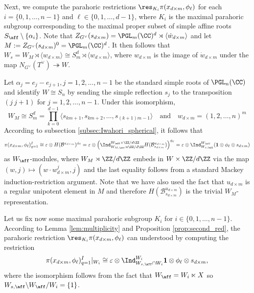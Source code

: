 Next, we compute the parahoric restrictions $\res_{K_i}\pi(x_{d\times m},\phi_\ell)$ for each $i=\{0,1,\ldots,n-1\}$ and $\ell\in\{0,1,\ldots,d-1\}$, where $K_i$ is the maximal parahoric subgroup corresponding to the maximal proper subset of simple affine roots $S_{\aff}\setminus\{\alpha_i\}$. Note that $Z_{G^\vee}(s_{d\times m})=\PGL_m(\CC)^d\rtimes\langle\dot{w}_{d\times m}\rangle$ and let $M:=Z_{G^\vee}(s_{d\times m})^0=\PGL_m(\CC)^d$. It then follows that $W_s=W_M\rtimes\langle w_{d\times m}\rangle\cong S_m^d\rtimes\langle w_{d\times m}\rangle$, where $w_{d\times m}$ is the image of $\dot{w}_{d\times m}$ under the map $N_{G^\vee}(T^\vee)\twoheadrightarrow W$. 

Let $\alpha_j=e_j-e_{j+1}, j=1,2,\ldots, n-1$ be the standard simple roots of $\PGL_n(\CC)$ and identify $W\cong S_n$ by sending the simple reflection $s_j$ to the transposition $(j\ j+1)$ for $j=1,2,\ldots,n-1$. Under this isomorphism, 
$$W_M\cong S_m^d=\prod_{k=0}^{d-1}\langle s_{km+1},s_{km+2},\ldots,s_{(k+1)m-1}\rangle\quad\text{and}\quad w_{d\times m}=(1,2,\ldots,n)^m$$
According to subsection \ref{subsec:Iwahori_spherical}, it follows that 
$$\pi(x_{d\times m},\phi_\ell)^I_{q=1}\cong\varepsilon\otimes H(\mathcal{B}^{x_{d\times m}})^{\phi_\ell}=\varepsilon\otimes\left(\Ind_{W_{M,\aff}\rtimes\ZZ/d\ZZ}^{W_{\aff}\times \ZZ/d\ZZ}H(\mathcal{B}_{s_{d\times m}}^{u_{d\times m}})\right)^{\phi_\ell}=\varepsilon\otimes\Ind_{W_{s,\aff}}^{W_\aff}(\mathbf{1}\otimes\phi_\ell\otimes s_{d\times m})$$
as $W_\aff$-modules, where $W_M\rtimes\ZZ/d\ZZ$ embeds in $W\times \ZZ/d\ZZ$ via the map $(w,j)\mapsto(w\cdot w_{d\times m}^j,j)$ and the last equality follows from a standard Mackey induction-restriction argument. Note that we have also used the fact that $u_{d\times m}$ is a regular unipotent element in $M$ and therefore $H(\mathcal{B}_{s_{d\times m}}^{u_{d\times m}})$ is the trivial $W_M$-representation.

Let us fix now some maximal parahoric subgroup $K_i$ for $i\in\{0,1,\ldots,n-1\}$. According to Lemma \ref{lem:multiplicity} and Proposition \ref{prop:second_red}, the parahoric restriction $\res_{K_i}\pi(x_{d\times m},\phi_\ell)$ can understood by computing the restriction
$$\pi(x_{d\times m},\phi_\ell)^I_{q=1}|_{W_i}\cong\varepsilon\otimes\Ind^{W_i}_{W_{s,\aff}\cap W_i}\mathbf{1}\otimes \phi_\ell\otimes s_{d\times m},$$
where the isomorphism follows from the fact that $W_{\aff}=W_i\ltimes X$ so $W_{s,\aff}\backslash W_{\aff}/W_i=\{1\}$. 

